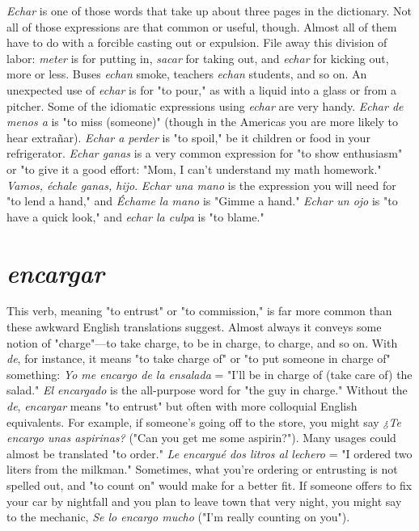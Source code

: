 \emph{Echar} is one of those words that take up about three pages in
the dictionary. Not all of those expressions are that common or useful,
though. Almost all of them have to do with a forcible casting out or
expulsion. File away this division of labor: \emph{meter} is for putting in, \emph{sacar} for taking out, and \emph{echar} for kicking out, more or less. Buses \emph{echan}
smoke, teachers \emph{echan} students, and so on. An unexpected use of
\emph{echar} is for "to pour," as with a liquid into a glass or from a pitcher.
Some of the idiomatic expressions using \emph{echar} are very handy. \emph{Echar
de menos a} is "to miss (someone)" (though in the Americas you are
more likely to hear extrañar). \emph{Echar a perder} is "to spoil," be it children or food in your refrigerator. \emph{Echar ganas} is a very common
expression for "to show enthusiasm" or "to give it a good effort: "Mom,
I can't understand my math homework." \emph{Vamos, échale ganas, hijo}.
\emph{Echar una mano} is the expression you will need for "to lend a hand,"
and \emph{Échame la mano} is "Gimme a hand." \emph{Echar un ojo} is "to have a
quick look," and \emph{echar la culpa} is "to blame."

\section{\emph{encargar}}

This verb, meaning "to entrust" or "to commission," is far
more common than these awkward English translations suggest. Almost always it conveys some notion of "charge"---to take charge, to be
in charge, to charge, and so on. With \emph{de}, for instance, it means "to take
charge of" or "to put someone in charge of" something: \emph{Yo me encargo
de la ensalada} = "I'll be in charge of (take care of) the salad." \emph{El encargado} is the all-purpose word for "the guy in charge." Without the
\emph{de}, \emph{encargar} means "to entrust" but often with more colloquial English equivalents. For example, if someone's going off to the store, you
might say \emph{¿Te encargo unas aspirinas?} ("Can you get me some aspirin?"). Many usages could almost be translated "to order." \emph{Le encargué
dos litros al lechero} = "I ordered two liters from the milkman." Sometimes, what you're ordering or entrusting is not spelled out, and "to
count on" would make for a better fit. If someone offers to fix your car
by nightfall and you plan to leave town that very night, you might say
to the mechanic, \emph{Se lo encargo mucho} ("I'm really counting on you").

